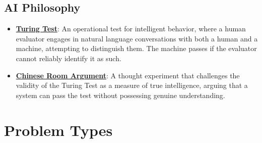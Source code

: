 \documentclass{article}%
\begin{document}
\subsection{AI Philosophy}%
\label{subsec:AIPhilosophy}%
\begin{itemize}[leftmargin=*]%
\item \href{\url{https://purdue.brightspace.com/d2l/common/assets/pdfjs-d2l-dist/1.0.14-legacy/web/viewer.html?file=\%252Fcontent\%252Fenforced\%252F1095467-wl.202510.CS.24300.001\%252F02L2-Intro.pdf\%253Fou\%253D1095467\&lang=en-us\&container=d2l-fileviewer-rendered-pdf\&fullscreen=d2l-fileviewer-rendered-pdf-dialog\&height=667}#page=6}{\textbf{Turing Test}}: An operational test for intelligent behavior, where a human evaluator engages in natural language conversations with both a human and a machine, attempting to distinguish them. The machine passes if the evaluator cannot reliably identify it as such.%
\item \href{\url{https://purdue.brightspace.com/d2l/common/assets/pdfjs-d2l-dist/1.0.14-legacy/web/viewer.html?file=\%252Fcontent\%252Fenforced\%252F1095467-wl.202510.CS.24300.001\%252F02L2-Intro.pdf\%253Fou\%253D1095467\&lang=en-us\&container=d2l-fileviewer-rendered-pdf\&fullscreen=d2l-fileviewer-rendered-pdf-dialog\&height=667}#page=7}{\textbf{Chinese Room Argument}}: A thought experiment that challenges the validity of the Turing Test as a measure of true intelligence, arguing that a system can pass the test without possessing genuine understanding.%
\end{itemize}

%
\section{Problem Types}%
\label{sec:ProblemTypes}%
\end{document}
